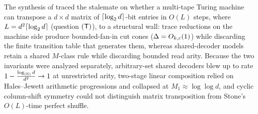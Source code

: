 The synthesis of \cite{SeventeenthPaper2026} traced the stalemate on whether a multi-tape
Turing machine can transpose a $d\times d$ matrix of $\lceil \log_2 d \rceil$-bit entries in $O(L)$ steps,
where $L = d^2\lceil \log_2 d \rceil$ (question $(\mathsf{T})$), to a structural wall: trace reductions on the
machine side produce bounded-fan-in cut cones ($\Delta = O_{k,\varepsilon}(1)$) while discarding
the finite transition table that generates them, whereas shared-decoder models retain a
shared $M$-class rule while discarding bounded read arity. Because the two invariants were
analyzed separately, arbitrary-set shared decoders blew up to rate
$1 - \frac{\log_{\lvert \Sigma \rvert} d}{d^2} \to 1$ at unrestricted arity, two-stage linear
composition relied on Hales--Jewett arithmetic progressions and collapsed at
$M_1 \approx \log\log d$, and cyclic column-shift symmetry could not distinguish matrix
transposition from Stone's $O(L)$-time perfect shuffle.

